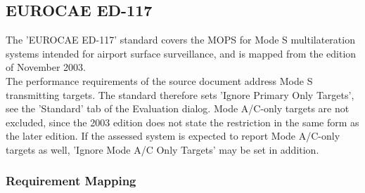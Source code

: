\subsection{EUROCAE ED-117}
\label{sec:appendix_eval_std_ed117}

The 'EUROCAE ED-117' standard covers the MOPS for Mode S multilateration systems intended for airport surface surveillance, and is mapped from the edition of November 2003. \\

The performance requirements of the source document address Mode S transmitting targets. The standard therefore sets 'Ignore Primary Only Targets', see the 'Standard' tab of the Evaluation dialog. Mode A/C-only targets are not excluded, since the 2003 edition does not state the restriction in the same form as the later edition. If the assessed system is expected to report Mode A/C-only targets as well, 'Ignore Mode A/C Only Targets' may be set in addition. \\

\subsubsection{Requirement Mapping}

